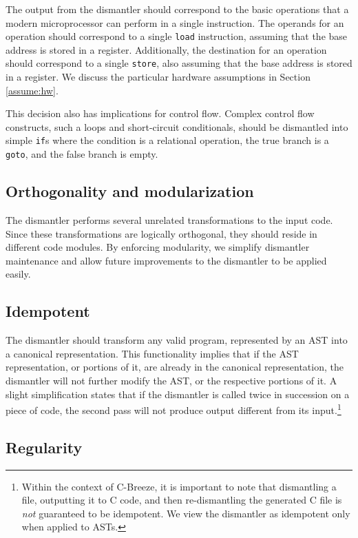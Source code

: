 \documentclass{article}
\begin{document}
The output from the dismantler should correspond to the basic
operations that a modern microprocessor can perform in a single
instruction.  The operands for an operation should correspond to a
single \texttt{load} instruction, assuming that the base address is
stored in a register.  Additionally, the destination for an operation
should correspond to a single \texttt{store}, also assuming that the
base address is stored in a register.  We discuss the particular
hardware assumptions in Section \ref{assume:hw}.

This decision also has implications for control flow.  Complex control
flow constructs, such a loops and short-circuit conditionals, should
be dismantled into simple \texttt{if}s where the condition is a
relational operation, the true branch is a \texttt{goto}, and the
false branch is empty.

\subsection{Orthogonality and modularization}

The dismantler performs several unrelated transformations to the input
code.  Since these transformations are logically orthogonal, they
should reside in different code modules.  By enforcing modularity, we
simplify dismantler maintenance and allow future improvements to the
dismantler to be applied easily.

\subsection{\label{prin:idem} Idempotent}

The dismantler should transform any valid program, represented by an
AST into a canonical representation.  This functionality implies that
if the AST representation, or portions of it, are already in the
canonical representation, the dismantler will not further modify the
AST, or the respective portions of it.  A slight simplification states
that if the dismantler is called twice in succession on a piece of
code, the second pass will not produce output different from its
input.\footnote{Within the context of C-Breeze, it is important to
note that dismantling a file, outputting it to C code, and then
re-dismantling the generated C file is \emph{not} guaranteed to be
idempotent.  We view the dismantler as idempotent only when applied to
ASTs.}

\subsection{Regularity}
\end{document}
